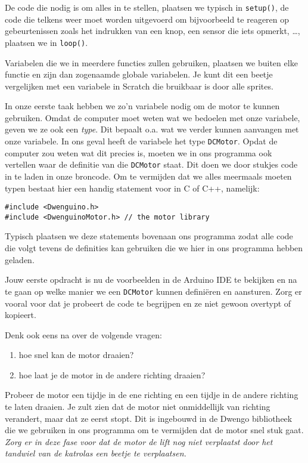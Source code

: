 \documentclass{article}
\begin{document}
De code die nodig is om alles in te stellen, plaatsen we typisch in \texttt{setup()}, de code die telkens weer moet worden
uitgevoerd om bijvoorbeeld te reageren op gebeurtenissen zoals het indrukken van een knop, een sensor die iets opmerkt,
\ldots, plaatsen we in \texttt{loop()}.

Variabelen die we in meerdere functies zullen gebruiken, plaatsen we buiten elke functie en zijn dan zogenaamde globale
variabelen. Je kunt dit een beetje vergelijken met een variabele in Scratch die bruikbaar is door alle sprites.

In onze eerste taak hebben we zo'n variabele nodig om de motor te kunnen gebruiken. Omdat de computer moet weten wat we
bedoelen met onze variabele, geven we ze ook een {\em type}. Dit bepaalt o.a. wat we verder kunnen aanvangen met onze
variabele. In ons geval heeft de variabele het type \texttt{DCMotor}. Opdat de computer zou weten wat dit precies is,
moeten we in ons programma ook vertellen waar de definitie van die \texttt{DCMotor} staat. Dit doen we door stukjes code
in te laden in onze broncode. Om te vermijden dat we alles meermaals moeten typen bestaat hier een handig statement voor
in C of C++, namelijk:

\begin{lstlisting}
#include <Dwenguino.h>
#include <DwenguinoMotor.h> // the motor library
\end{lstlisting}

Typisch plaatsen we deze statements bovenaan ons programma zodat alle code die volgt tevens de definities kan gebruiken
die we hier in ons programma hebben geladen.

Jouw eerste opdracht is nu de voorbeelden in de Arduino IDE te bekijken en na te gaan op welke manier we een
\texttt{DCMotor} kunnen defini\"eren en aansturen. Zorg er vooral voor dat je probeert de code te begrijpen en ze
niet gewoon overtypt of kopieert.

Denk ook eens na over de volgende vragen:

\begin{enumerate}
\item hoe snel kan de motor draaien?
\item hoe laat je de motor in de andere richting draaien?
\end{enumerate}

Probeer de motor een tijdje in de ene richting en een tijdje in de andere richting te laten draaien. Je zult zien dat
de motor niet onmiddellijk van richting verandert, maar dat ze eerst stopt. Dit is ingebouwd in de Dwengo bibliotheek
die we gebruiken in ons programma om te vermijden dat de motor snel stuk gaat. {\em Zorg er in deze fase voor dat de motor de
lift nog niet verplaatst door het tandwiel van de katrolas een beetje te verplaatsen.}
\end{document}
